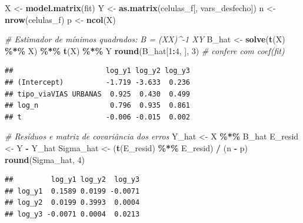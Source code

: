 \documentclass[
  11pt,
]{article}
\newenvironment{Shaded}{\begin{snugshade}}{\end{snugshade}}
\newcommand{\CommentTok}[1]{\textcolor[rgb]{0.56,0.35,0.01}{\textit{#1}}}
\newcommand{\DecValTok}[1]{\textcolor[rgb]{0.00,0.00,0.81}{#1}}
\newcommand{\FunctionTok}[1]{\textcolor[rgb]{0.13,0.29,0.53}{\textbf{#1}}}
\newcommand{\NormalTok}[1]{#1}
\newcommand{\OtherTok}[1]{\textcolor[rgb]{0.56,0.35,0.01}{#1}}
\newcommand{\SpecialCharTok}[1]{\textcolor[rgb]{0.81,0.36,0.00}{\textbf{#1}}}
\begin{document}
\begin{Shaded}
\begin{Highlighting}[]
\NormalTok{X }\OtherTok{\textless{}{-}} \FunctionTok{model.matrix}\NormalTok{(fit)}
\NormalTok{Y }\OtherTok{\textless{}{-}} \FunctionTok{as.matrix}\NormalTok{(celulas\_f[, vars\_desfecho])}
\NormalTok{n }\OtherTok{\textless{}{-}} \FunctionTok{nrow}\NormalTok{(celulas\_f)}
\NormalTok{p }\OtherTok{\textless{}{-}} \FunctionTok{ncol}\NormalTok{(X)}

\CommentTok{\# Estimador de mínimos quadrados: B = (X\textquotesingle{}X)\^{}{-}1 X\textquotesingle{}Y}
\NormalTok{B\_hat }\OtherTok{\textless{}{-}} \FunctionTok{solve}\NormalTok{(}\FunctionTok{t}\NormalTok{(X) }\SpecialCharTok{\%*\%}\NormalTok{ X) }\SpecialCharTok{\%*\%} \FunctionTok{t}\NormalTok{(X) }\SpecialCharTok{\%*\%}\NormalTok{ Y}
\FunctionTok{round}\NormalTok{(B\_hat[}\DecValTok{1}\SpecialCharTok{:}\DecValTok{4}\NormalTok{, ], }\DecValTok{3}\NormalTok{)   }\CommentTok{\# confere com coef(fit)}
\end{Highlighting}
\end{Shaded}

\begin{verbatim}
##                      log_y1 log_y2 log_y3
## (Intercept)          -1.719 -3.633  0.236
## tipo_viaVIAS URBANAS  0.925  0.430  0.499
## log_n                 0.796  0.935  0.861
## t                    -0.006 -0.015  0.002
\end{verbatim}

\begin{Shaded}
\begin{Highlighting}[]
\CommentTok{\# Resíduos e matriz de covariância dos erros}
\NormalTok{Y\_hat   }\OtherTok{\textless{}{-}}\NormalTok{ X }\SpecialCharTok{\%*\%}\NormalTok{ B\_hat}
\NormalTok{E\_resid }\OtherTok{\textless{}{-}}\NormalTok{ Y }\SpecialCharTok{{-}}\NormalTok{ Y\_hat}
\NormalTok{Sigma\_hat }\OtherTok{\textless{}{-}}\NormalTok{ (}\FunctionTok{t}\NormalTok{(E\_resid) }\SpecialCharTok{\%*\%}\NormalTok{ E\_resid) }\SpecialCharTok{/}\NormalTok{ (n }\SpecialCharTok{{-}}\NormalTok{ p)}
\FunctionTok{round}\NormalTok{(Sigma\_hat, }\DecValTok{4}\NormalTok{)}
\end{Highlighting}
\end{Shaded}

\begin{verbatim}
##         log_y1 log_y2  log_y3
## log_y1  0.1589 0.0199 -0.0071
## log_y2  0.0199 0.3993  0.0004
## log_y3 -0.0071 0.0004  0.0213
\end{verbatim}
\end{document}

